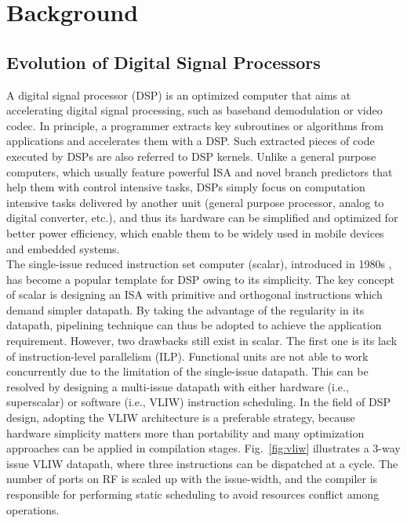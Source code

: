 \chapter{Background}
    \section{Evolution of Digital Signal Processors}
        A digital signal processor (DSP) is an optimized computer that aims at accelerating digital signal processing, such as baseband demodulation or video codec.
        In principle, a programmer extracts key subroutines or algorithms from applications and accelerates them with a DSP.
        Such extracted pieces of code executed by DSPs are also referred to DSP kernels.
        Unlike a general purpose computers, which usually feature powerful ISA and novel branch predictors that help them with control intensive tasks,
        DSPs simply focus on computation intensive tasks delivered by another unit (general purpose processor, analog to digital converter, etc.), 
        and thus its hardware can be simplified and optimized for better power efficiency, which enable them to be widely used in mobile devices and embedded systems.
        \\\indent
        The single-issue reduced instruction set computer (scalar), introduced in 1980s \cite{risc}, has become a popular template for DSP owing to its simplicity.
        The key concept of scalar is designing an ISA with primitive and orthogonal instructions which demand simpler datapath.
        By taking the advantage of the regularity in its datapath, pipelining technique can thus be adopted to achieve the application requirement.
        However, two drawbacks still exist in scalar. 
        The first one is its lack of instruction-level parallelism (ILP). 
        Functional units are not able to work concurrently due to the limitation of the single-issue datapath.
        This can be resolved by designing a multi-issue datapath with either hardware (i.e., superscalar) or software (i.e., VLIW) instruction scheduling.
        In the field of DSP design, adopting the VLIW architecture is a preferable strategy, 
        because hardware simplicity matters more than portability and many optimization approaches can be applied in compilation stages. 
        Fig.~\ref{fig:vliw} illustrates a 3-way issue VLIW datapath, where three instructions can be dispatched at a cycle.
        The number of ports on RF is scaled up with the issue-width, and the compiler is responsible for performing static scheduling to avoid resources conflict among operations.
